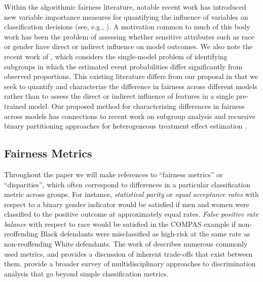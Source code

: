 \documentclass[11pt, sigconf, svgnames]{acmart}
\begin{document}
Within the algorithmic fairness literature, notable recent work has introduced new variable importance measures for quantifying the influence of variables on classification decisions (see, e.g., \citep{henelius2014peek, adler2016auditing, datta2015influence, datta2016algorithmic}).  A motivation common to much of this body work has been the problem of assessing whether sensitive attributes such as race or gender have direct or indirect influence on model outcomes.    We also note the recent work of \citet{zhang2016identifying},  which considers the single-model problem of identifying  subgroups in which the estimated event probabilities differ significantly from observed proportions.    This existing literature differs from our proposal in that we seek to quantify and characterize the difference in fairness across different models rather than to assess the direct or indirect influence of features in a single pre-trained model.  Our proposed method for characterizing differences in fairness across models has connections to recent work on subgroup analysis and recursive binary partitioning approaches for heterogeneous treatment effect estimation \citep{su2009subgroup, athey2015machine}.  
 
 \vspace{-0.6em}
 
\subsection{Fairness Metrics}

Throughout the paper we will make references to ``fairness metrics'' or ``disparities'', which often correspond to differences in a particular classification metric across groups.  For instance, \emph{statistical parity} or \emph{equal acceptance rates} with respect to a binary gender indicator would be satisfied if men and women were classified to the positive outcome at approximately equal rates.  \emph{False positive rate balance} with respect to race would be satisfied in the COMPAS example if non-reoffending Black defendants were misclassified as high-risk at the same rate as non-reoffending White defendants.  The work of \cite{hardt2016equality, kleinberg2016inherent, chouldechova2017fairlong, corbett2017algorithmic, berk2017fairness} describes numerous commonly used metrics, and provides a discussion of inherent trade-offs that exist between them.   \citet{romei2014multidisciplinary} provide a broader survey of multidisciplinary approaches to discrimination analysis that go beyond simple classification metrics.  
\end{document}
